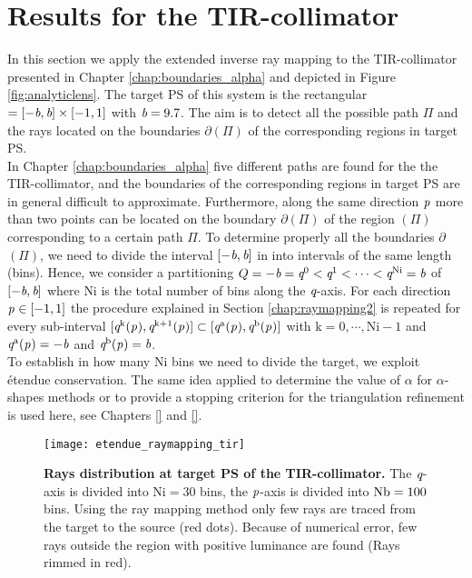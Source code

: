 \section{Results for the TIR-collimator}\label{sec:TIR}
In this section we apply the extended inverse ray mapping to the TIR-collimator presented in Chapter \ref{chap:boundaries_alpha} and depicted in Figure \ref{fig:analyticlens}. The target PS of this system is the rectangular $= [-\textit{b}, \textit{b}]\times[-1,1]$ with $\textit{b}=9.7$. The aim is to detect all the possible path $\Pi$ and the rays located on the boundaries $\partial$$(\Pi)$ of the corresponding regions in target PS. 
\\ \indent In Chapter \ref{chap:boundaries_alpha} five different paths are found for the the TIR-collimator, and the boundaries of the corresponding regions in target PS  are in general difficult to approximate. Furthermore, along the same direction $\textit{p}_{\textrm{} \textit{}}$ more than two points can be located on the boundary $\partial$$(\Pi)$ of the region $(\Pi)$ corresponding to a certain path $\Pi$. To determine properly all the boundaries 
$\partial$$(\Pi)$, we need to divide the interval $[-\textit{b}, \textit{b}]$ in 
 into intervals of the same length (bins). Hence, we consider a partitioning 
$Q = -\textit{b}=\textit{q}^{0}<\textit{q}^{1}<\cdots<\textit{q}^{\textrm{Ni}}=\textit{b}$ of $[-\textit{b}, \textit{b}]$ where $\textrm{Ni}$ is the total number of bins along the $\textit{q}$-axis.
For each direction $\textit{p}_{\textrm{} \textit{}}\in [-1,1]$ the procedure explained in Section \ref{chap:raymapping2} is repeated for every sub-interval $[\textit{q}^{\textrm{k}}(\textit{p}_{\textrm{} \textit{}}), \textit{q}^{\textrm{k}+1}(\textit{p}_{\textrm{} \textit{}})]\subset [\textit{q}^{\textrm{a}}(\textit{p}_{\textrm{} \textit{}}), \textit{q}^{\textrm{b}}(\textit{p}_{\textrm{} \textit{}})]$ with $\textrm{k}=0, \cdots, \textrm{Ni}-1$ and $\textit{q}^{\textrm{a}}(\textit{p}_{\textrm{} \textit{}}) = -\textit{b}$ and $\textit{q}^{\textrm{b}}(\textit{p}_{\textrm{} \textit{}}) = \textit{b}$.\\ \indent
To establish in how many \textrm{Ni} bins we need to divide the target, we exploit \'{e}tendue conservation. The same idea applied to determine the value of $\alpha$ for $\alpha$-shapes methods or to provide a stopping criterion for the triangulation refinement is used here, see Chapters \ref{} and \ref{}.
\begin{figure}[h]
  \begin{center}
  \texttt{[image: etendue\_raymapping\_tir]}
  \end{center}
  \caption{\textbf{Rays distribution at target PS of the TIR-collimator.}
 The $\textit{q}$-axis is divided into $\textrm{Ni}=30$ bins, the $\textit{p}$-axis is divided into $\textrm{Nb} = 100$ bins. Using the ray mapping method only few rays are traced from the target to the source (red dots). Because of numerical error, few rays outside the region with positive luminance are found (Rays rimmed in red).}
\label{fig:boundaries_TIR_ray_mapping}
 \end{figure}
